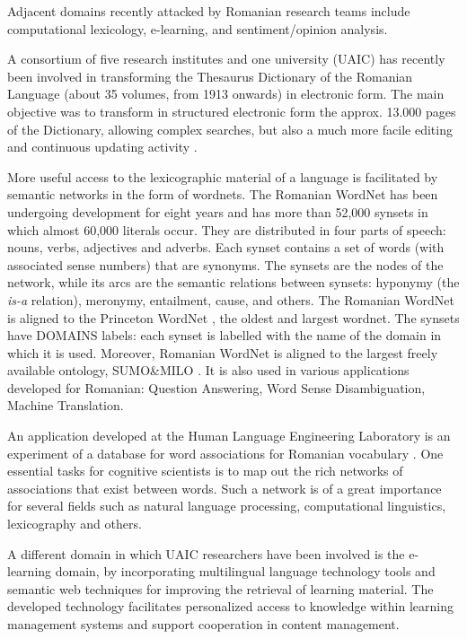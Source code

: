 \documentclass[]{../../metanetpaper}
\begin{document}
\begin{multicols}{2}
Adjacent domains recently attacked by Romanian research teams include computational lexicology, e-learning, and sentiment/opinion analysis. 

A consortium of five research institutes and one university (UAIC) has recently been involved in transforming the Thesaurus Dictionary of the Romanian Language (about 35 volumes, from 1913 onwards) in electronic form. The main objective was to transform in structured electronic form the approx. 13.000 pages of the Dictionary, allowing complex searches, but also a much more facile editing and continuous updating activity \cite{cristea3}.

More useful access to the lexicographic material of a language is facilitated by semantic networks in the form of wordnets. The Romanian WordNet has been undergoing development for eight years and has more than 52,000 synsets in which almost 60,000 literals occur. They are distributed in four parts of speech: nouns, verbs, adjectives and adverbs. Each synset contains a set of words (with associated sense numbers) that are synonyms. The synsets are the nodes of the network, while its arcs are the semantic relations between synsets: hyponymy (the \textit{is-a} relation), meronymy, entailment, cause, and others. The Romanian WordNet is aligned to the Princeton WordNet \cite{wnURL}, the oldest and largest wordnet. The synsets have DOMAINS labels: each synset is labelled with the name of the domain in which it is used. Moreover, Romanian WordNet is aligned to the largest freely available ontology, SUMO\&MILO \cite{ro_wnURL}. It is also used in various applications developed for Romanian: Question Answering, Word Sense Disambiguation, Machine Translation.

An application developed at the Human Language Engineering Laboratory is an experiment of a database for word associations for Romanian vocabulary \cite{sem_dict}. One essential tasks for cognitive scientists is to map out the rich networks of associations that exist between words. Such a network is of a great importance for several fields such as natural language processing, computational linguistics, lexicography and others.

A different domain in which UAIC researchers have been involved is the e-learning domain, by incorporating multilingual language technology tools and semantic web techniques for improving the retrieval of learning material. The developed technology facilitates personalized access to knowledge within learning management systems and support cooperation in content management.


\end{multicols}
\end{document}
